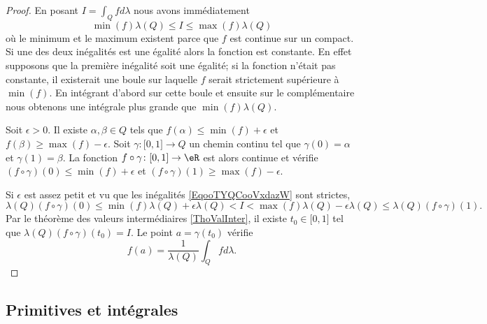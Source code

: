 \begin{proof}
    En posant \( I=\int_Qfd\lambda\) nous avons immédiatement
    \begin{equation}        \label{EqooTYQCooVxdazW}
        \min(f)\lambda(Q)\leq I\leq \max(f)\lambda(Q)
    \end{equation}
    où le minimum et le maximum existent parce que \( f\) est continue sur un compact. Si une des deux inégalités est une égalité alors la fonction est constante. En effet supposons que la première inégalité soit une égalité; si la fonction n'était pas constante, il existerait une boule sur laquelle \( f\) serait strictement supérieure à \( \min(f)\). En intégrant d'abord sur cette boule et ensuite sur le complémentaire nous obtenons une intégrale plus grande que \( \min(f)\lambda(Q)\).

    Soit \( \epsilon>0\). Il existe \( \alpha,\beta\in Q\) tels que \( f(\alpha)\leq\min(f)+\epsilon\) et \( f(\beta)\geq\max(f)-\epsilon\). Soit \( \gamma\colon \mathopen[ 0 , 1 \mathclose]\to Q\) un chemin continu tel que \( \gamma(0)=\alpha\) et \( \gamma(1)=\beta\). La fonction \( f\circ \gamma\colon \mathopen[ 0 , 1 \mathclose]\to \eR\) est alors continue et vérifie \( (f\circ\gamma)(0)\leq \min(f)+\epsilon\) et \( (f\circ\gamma)(1)\geq \max(f)-\epsilon\).

    Si \( \epsilon\) est assez petit et vu que les inégalités \eqref{EqooTYQCooVxdazW} sont strictes,
    \begin{equation}
        \lambda(Q)(f\circ\gamma)(0)\leq \min(f)\lambda(Q)+\epsilon\lambda(Q)<I<\max(f)\lambda(Q)-\epsilon\lambda(Q)\leq\lambda(Q)(f\circ \gamma)(1).
    \end{equation}
    Par le théorème des valeurs intermédiaires \ref{ThoValInter}, il existe \( t_0\in\mathopen[ 0 , 1 \mathclose]\) tel que \( \lambda(Q)(f\circ\gamma)(t_0)=I\). Le point \( a=\gamma(t_0)\) vérifie
    \begin{equation}
        f(a)=\frac{1}{ \lambda(Q) }\int_Qfd\lambda.
    \end{equation}
\end{proof}

\subsection{Primitives et intégrales}

